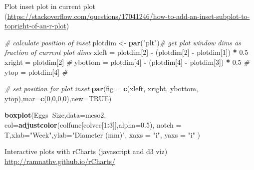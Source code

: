 \documentclass[10,portrait]{article}
\newenvironment{Shaded}{\begin{snugshade}}{\end{snugshade}}
\newcommand{\KeywordTok}[1]{\textcolor[rgb]{0.13,0.29,0.53}{\textbf{#1}}}
\newcommand{\DataTypeTok}[1]{\textcolor[rgb]{0.13,0.29,0.53}{#1}}
\newcommand{\DecValTok}[1]{\textcolor[rgb]{0.00,0.00,0.81}{#1}}
\newcommand{\FloatTok}[1]{\textcolor[rgb]{0.00,0.00,0.81}{#1}}
\newcommand{\StringTok}[1]{\textcolor[rgb]{0.31,0.60,0.02}{#1}}
\newcommand{\CommentTok}[1]{\textcolor[rgb]{0.56,0.35,0.01}{\textit{#1}}}
\newcommand{\OtherTok}[1]{\textcolor[rgb]{0.56,0.35,0.01}{#1}}
\newcommand{\OperatorTok}[1]{\textcolor[rgb]{0.81,0.36,0.00}{\textbf{#1}}}
\newcommand{\NormalTok}[1]{#1}
\begin{document}
Plot inset plot in current plot
(\url{https://stackoverflow.com/questions/17041246/how-to-add-an-inset-subplot-to-topright-of-an-r-plot})

\begin{Shaded}
\begin{Highlighting}[]
\CommentTok{# calculate position of inset}
\NormalTok{plotdim <-}\StringTok{ }\KeywordTok{par}\NormalTok{(}\StringTok{"plt"}\NormalTok{)}\CommentTok{# get plot window dims as fraction of current plot dims }
\NormalTok{xleft    =}\StringTok{ }\NormalTok{plotdim[}\DecValTok{2}\NormalTok{] }\OperatorTok{-}\StringTok{ }\NormalTok{(plotdim[}\DecValTok{2}\NormalTok{] }\OperatorTok{-}\StringTok{ }\NormalTok{plotdim[}\DecValTok{1}\NormalTok{]) }\OperatorTok{*}\StringTok{ }\FloatTok{0.5}
\NormalTok{xright   =}\StringTok{ }\NormalTok{plotdim[}\DecValTok{2}\NormalTok{]  }\CommentTok{#}
\NormalTok{ybottom  =}\StringTok{ }\NormalTok{plotdim[}\DecValTok{4}\NormalTok{] }\OperatorTok{-}\StringTok{ }\NormalTok{(plotdim[}\DecValTok{4}\NormalTok{] }\OperatorTok{-}\StringTok{ }\NormalTok{plotdim[}\DecValTok{3}\NormalTok{]) }\OperatorTok{*}\StringTok{ }\FloatTok{0.5}  \CommentTok{#}
\NormalTok{ytop     =}\StringTok{ }\NormalTok{plotdim[}\DecValTok{4}\NormalTok{]  }\CommentTok{#}

\CommentTok{# set position for plot inset}
\KeywordTok{par}\NormalTok{(}\DataTypeTok{fig =} \KeywordTok{c}\NormalTok{(xleft, xright, ybottom, ytop),}\DataTypeTok{mar=}\KeywordTok{c}\NormalTok{(}\DecValTok{0}\NormalTok{,}\DecValTok{0}\NormalTok{,}\DecValTok{0}\NormalTok{,}\DecValTok{0}\NormalTok{),}\DataTypeTok{new=}\OtherTok{TRUE}\NormalTok{)}

\KeywordTok{boxplot}\NormalTok{(Eggs}\OperatorTok{~}\NormalTok{Size,}\DataTypeTok{data=}\NormalTok{meso2,}
                \DataTypeTok{col=}\KeywordTok{adjustcolor}\NormalTok{(colfunc[colvec[}\DecValTok{1}\OperatorTok{:}\DecValTok{3}\NormalTok{]],}\DataTypeTok{alpha=}\FloatTok{0.5}\NormalTok{),}
                \DataTypeTok{notch =}\NormalTok{ T,}\DataTypeTok{xlab=}\StringTok{"Week"}\NormalTok{,}\DataTypeTok{ylab=}\StringTok{"Diameter (mm)"}\NormalTok{,}
                \DataTypeTok{xaxs =} \StringTok{"i"}\NormalTok{, }\DataTypeTok{yaxs =} \StringTok{"i"}
\NormalTok{                ) }
\end{Highlighting}
\end{Shaded}

Interactive plots with rCharts (javascript and d3 viz)\\
\url{http://ramnathv.github.io/rCharts/}
\end{document}
